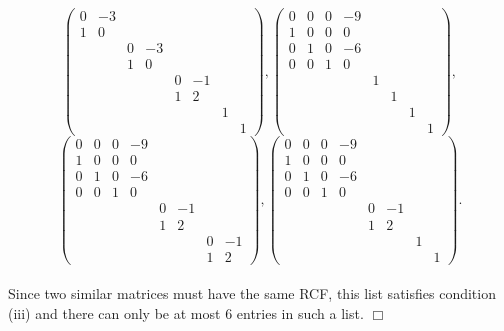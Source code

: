 \documentclass[12pt]{article}
\begin{document}
\[    
    \begin{pmatrix}
        0 & -3 &  &  &  &  &  &  \\
        1 & 0 &  &  &  &  &  &  \\
         &  & 0 & -3 &  &  &  &  \\
         &  & 1 & 0 &  &  &  &  \\
         &  &  &  & 0 & -1 &  &  \\
         &  &  &  & 1 & 2 &  &  \\
         &  &  &  &  &  & 1 &  \\
         &  &  &  &  &  &  & 1 
    \end{pmatrix},
    \begin{pmatrix}
        0 & 0 & 0 & -9 &  &  &  &  \\
        1 & 0 & 0 & 0 &  &  &  &  \\
        0 & 1 & 0 & -6 &  &  &  &  \\
        0 & 0 & 1 & 0 &  &  &  &  \\
         &  &  &  & 1 &  &  & \\
         &  &  &  &  & 1 &  & \\
         &  &  &  &  &  & 1 &  \\
         &  &  &  &  &  &  & 1  
    \end{pmatrix}, 
\]
\[
    \begin{pmatrix}
        0 & 0 & 0 & -9 &  &  &  &  \\
        1 & 0 & 0 & 0 &  &  &  &  \\
        0 & 1 & 0 & -6 &  &  &  &  \\
        0 & 0 & 1 & 0 &  &  &  &  \\
         &  &  &  & 0 & -1 &  & \\
         &  &  &  & 1 & 2 &  & \\
         &  &  &  &  &  & 0 & -1 \\
         &  &  &  &  &  & 1 & 2  
    \end{pmatrix},
    \begin{pmatrix}
        0 & 0 & 0 & -9 &  &  &  &  \\
        1 & 0 & 0 & 0 &  &  &  &  \\
        0 & 1 & 0 & -6 &  &  &  &  \\
        0 & 0 & 1 & 0 &  &  &  &  \\
         &  &  &  & 0 & -1 &  & \\
         &  &  &  & 1 & 2 &  & \\
         &  &  &  &  &  & 1 &  \\
         &  &  &  &  &  &  & 1  
    \end{pmatrix}.
\]
\\
Since two similar matrices must have the same RCF, this list satisfies condition (iii) and there can only be at most $6$ entries in such a list. \hfill $\Box$
\end{document}
